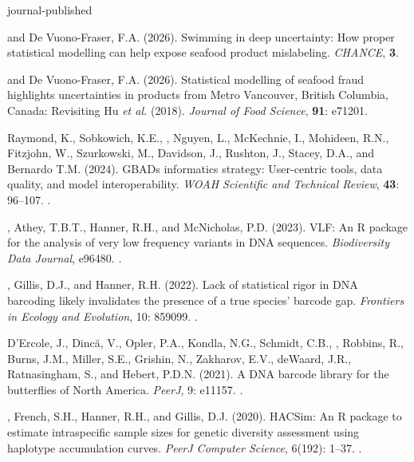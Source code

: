 \begin{revlist}[itemsep=0.45\baselineskip]{journal-published}
\item \me and \dsup De Vuono-Fraser, F.A. (2026). Swimming in deep uncertainty:
  How proper statistical modelling can help expose seafood product mislabeling.
  \textit{CHANCE}, \textbf{3}. 
\item \me and \dsup De Vuono-Fraser, F.A. (2026). Statistical modelling of
  seafood fraud highlights uncertainties in products from Metro Vancouver,
  British Columbia, Canada: Revisiting Hu \textit{et al.} (2018).
  \textit{Journal of Food Science}, \textbf{91}: e71201.
\item Raymond, K., Sobkowich, K.E., \me, Nguyen, L., McKechnie, I., Mohideen, R.N.,
  Fitzjohn, W., Szurkowski, M., Davidson, J., Rushton, J., Stacey, D.A., and
  Bernardo T.M. (2024). GBADs informatics strategy: User-centric tools, data
  quality, and model interoperability. \textit{WOAH Scientific and Technical
  Review}, \textbf{43}: 96--107.
  .
\item \me, Athey, T.B.T., Hanner, R.H., and McNicholas, P.D. (2023). VLF: An R
  package for the analysis of very low frequency variants in DNA sequences.
  \textit{Biodiversity Data Journal}, e96480.
  .
\item \me, Gillis, D.J., and Hanner, R.H. (2022). Lack of statistical rigor in
  DNA barcoding likely invalidates the presence of a true species' barcode gap.
  \textit{Frontiers in Ecology and Evolution}, 10: 859099. .
\item D'Ercole, J., Dincă, V., Opler, P.A., Kondla, N.G., Schmidt, C.B., \me,
  Robbins, R., Burns, J.M., Miller, S.E., Grishin, N., Zakharov, E.V.,
  deWaard, J.R., Ratnasingham, S., and Hebert, P.D.N. (2021). A DNA barcode
  library for the butterflies of North America. \textit{PeerJ}, 9: e11157.
  .
\item \me, \dsup French, S.H., Hanner, R.H., and Gillis, D.J. (2020). HACSim: An
  R package to estimate intraspecific sample sizes for genetic diversity
  assessment using haplotype accumulation curves. \textit{PeerJ Computer
  Science}, 6(192): 1--37.
  .

\end{revlist}
